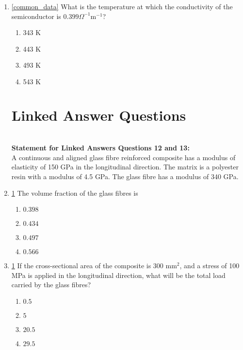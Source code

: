 \documentclass[journal]{IEEEtran}
\begin{document}
\begin{enumerate}
\begin{enumerate}
\end{enumerate}

\item\ref{common_data} What is the temperature at which the conductivity of the semiconductor is $0.399 \Omega^{-1}\text{m}^{-1}$?
\begin{multicols}{4}
\begin{enumerate}
    \item 343 K
    \item 443 K
    \item 493 K
    \item 543 K
\end{enumerate}
\end{multicols}

\section{\textbf{Linked Answer Questions}}\label{Linked_questions}\\
\textbf{Statement for Linked Answers Questions 12 and 13:} \\ A continuous and aligned glass fibre reinforced composite has a modulus of elasticity of 150 GPa in the longitudinal direction. The matrix is a polyester resin with a modulus of 4.5 GPa. The glass fibre has a modulus of 340 GPa.\\
\item\ref{Linked_questions} The volume fraction of the glass fibres is
\begin{multicols}{4}
\begin{enumerate}
    \item $0.398$
    \item $0.434$
    \item $0.497$
    \item $0.566$
\end{enumerate}
\end{multicols}
\item\ref{Linked_questions} If the cross-sectional area of the composite is 300
 mm$^{2}$, and a stress of 100 MPa is applied in the longitudinal direction, what will be the total load  carried by the glass fibres?  
\begin{multicols}{2}
\begin{enumerate}
    \item $0.5$
    \item $5$
    \item $20.5$
    \item $29.5$
\end{enumerate}
\end{multicols}
\end{enumerate}
\end{document}
